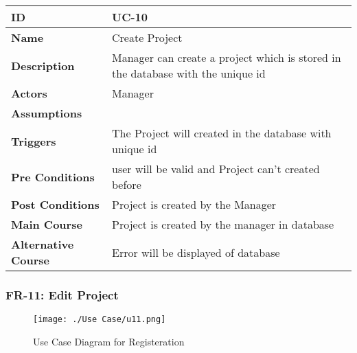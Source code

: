    \begin{center}
        \begin{tabularx}{\textwidth}{|l|X|}
            \hline
            \textbf{ID} & UC-10 \\
            \hline
            \textbf{Name} & Create Project \\
            \hline
            \textbf{Description} & Manager can create a project which is stored in the database with the unique id \\
            \hline
            \textbf{Actors} & Manager \\
            \hline
            \textbf{Assumptions} &  \\
            \hline
            \textbf{Triggers} & The Project will created in the database with unique id \\
            \hline
            \textbf{Pre Conditions} & user will be valid and Project can't created before  \\
            \hline
            \textbf{Post Conditions} & Project is created by the Manager \\
            \hline
            \textbf{Main Course} & Project is created by the manager in database \\
            \hline
            \textbf{Alternative Course} & Error will be displayed of database  \\
            \hline
            
        \end{tabularx}
    \end{center}
    
    \newpage

    \subsubsection{FR-11: Edit Project}
    \begin{figure}[H]
        \texttt{[image: ./Use Case/u11.png]}
        \centering 
        \caption{Use Case Diagram for Registeration}
        \label{fig:prototype1}
        \end{figure}
        
